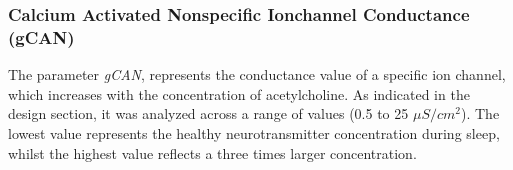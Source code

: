     
        \subsubsection{Calcium Activated Nonspecific Ionchannel Conductance (gCAN)}
        The parameter \textit{gCAN}, represents the conductance value of a specific ion channel, which increases with the concentration of acetylcholine. As indicated in the design section, it was analyzed across a range of values (0.5 to 25 \(\mu S/cm^2\)). The lowest value represents the healthy neurotransmitter concentration during sleep, whilst the highest value reflects a three times larger concentration.
        
